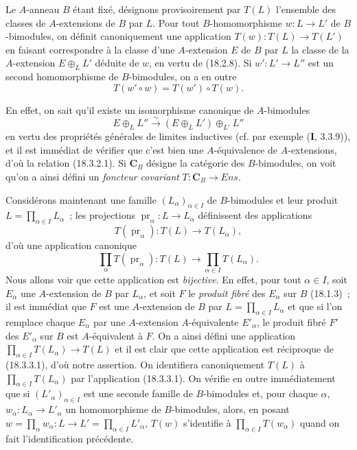 \begin{env}[18.3.2]
\label{0.18.3.2-fr}
Le $A$-anneau $B$ étant fixé, désignons provisoirement par $T(L)$ l'ensemble
des classes de $A$-extensions de $B$ par $L$. Pour tout $B$-homomorphisme
$w:L\to L'$ de $B$-bimodules, on définit canoniquement une application
$T(w):T(L)\to T(L')$ en faisant correspondre à la classe d'une $A$-extension
$E$ de $B$ par $L$ la classe de la $A$-extension $E\oplus_LL'$ déduite de
$w$, en vertu de (18.2.8). Si $w':L'\to L''$ est un second homomorphisme
de $B$-bimodules, on a en outre
\begin{equation}
\label{0.18.3.2.1-fr}
\tag{18.3.2.1}
  T(w'\circ w)=T(w')\circ T(w).
\end{equation}

En effet, on sait qu'il existe un isomorphisme canonique de $A$-bimodules
\[
  E\oplus_LL''\xrightarrow{\sim}(E\oplus_LL')\oplus_{L'}L''
\]
en vertu des propriétés générales de limites inductives (cf. par exemple
(\textbf{I}, 3.3.9)), et il est immédiat de vérifier que c'est bien une
$A$-équivalence de $A$-extensions, d'où
la relation (18.3.2.1). Si $\boldsymbol{C}_B$ désigne la catégorie des
$B$-bimodules, on voit qu'on a ainsi défini un \emph{foncteur covariant}
$T:\boldsymbol{C}_B\to\boldsymbol{\mathit{Ens}}$.
\end{env}

\begin{env}[18.3.3]
\label{0.18.3.3-fr}
Considérons maintenant une famille $(L_\alpha)_{\alpha\in I}$ de
$B$-bimodules et leur produit $L=\prod_{\alpha\in I}L_\alpha$~; les
projections $\operatorname{pr}_\alpha:L\to L_\alpha$ définissent des
applications
\[
  T(\operatorname{pr}_\alpha):T(L)\to T(L_\alpha),
\]
d'où une application canonique
\begin{equation}
\label{0.18.3.3.1-fr}
\tag{18.3.3.1}
  \prod_\alpha T(\operatorname{pr}_\alpha):T(L)
  \longrightarrow\prod_{\alpha\in I}T(L_\alpha).
\end{equation}
Nous allons voir que cette application est \emph{bijective}. En effet, pour
tout $\alpha\in I$, soit $E_\alpha$ une $A$-extension de $B$ par $L_\alpha$,
et soit $F$ le \emph{produit fibré} des $E_\alpha$ sur $B$ (18.1.3)~; il est
immédiat que $F$ est une $A$-extension de $B$ par
$L=\prod_{\alpha\in I}L_\alpha$ et que si l'on remplace chaque $E_\alpha$ par
une $A$-extension $A$-équivalente $E'_\alpha$, le produit fibré $F'$ des
$E'_\alpha$ sur $B$ est $A$-équivalent à $F$. On a ainsi défini une
application $\prod_{\alpha\in I}T(L_\alpha)\to T(L)$ et il est clair que cette
application est réciproque de (18.3.3.1), d'où notre assertion. On identifiera
canoniquement $T(L)$ à $\prod_{\alpha\in I}T(L_\alpha)$ par l'application
(18.3.3.1). On vérifie en outre immédiatement que si
$(L'_\alpha)_{\alpha\in I}$ est une seconde famille de $B$-bimodules et, pour
chaque $\alpha$, $w_\alpha:L_\alpha\to L'_\alpha$ un homomorphisme de
$B$-bimodules, alors, en posant
$w=\prod_\alpha w_\alpha:L\to L'=\prod_{\alpha\in I}L'_\alpha$, $T(w)$
s'identifie à $\prod_{\alpha\in I}T(w_\alpha)$ quand on fait l'identification
précédente.
\end{env}

